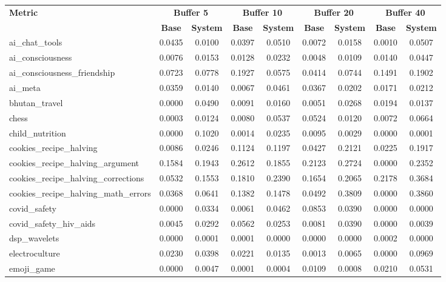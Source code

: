\begin{landscape}
\begin{longtable}{@{}p{3.8cm}cccccccc@{}}
\toprule
\textbf{Metric} & \multicolumn{2}{c}{\textbf{Buffer 5}} & \multicolumn{2}{c}{\textbf{Buffer 10}} & \multicolumn{2}{c}{\textbf{Buffer 20}} & \multicolumn{2}{c}{\textbf{Buffer 40}} \\
\cmidrule(lr){2-3}\cmidrule(lr){4-5}\cmidrule(lr){6-7}\cmidrule(lr){8-9}
 & \textbf{Base} & \textbf{System} & \textbf{Base} & \textbf{System} & \textbf{Base} & \textbf{System} & \textbf{Base} & \textbf{System} \\
\midrule
\endhead
ai\_chat\_tools & 0.0435 & 0.0100 & 0.0397 & 0.0510 & 0.0072 & 0.0158 & 0.0010 & 0.0507 \\
ai\_consciousness & 0.0076 & 0.0153 & 0.0128 & 0.0232 & 0.0048 & 0.0109 & 0.0140 & 0.0447 \\
ai\_consciousness\_friendship & 0.0723 & 0.0778 & 0.1927 & 0.0575 & 0.0414 & 0.0744 & 0.1491 & 0.1902 \\
ai\_meta & 0.0359 & 0.0140 & 0.0067 & 0.0461 & 0.0367 & 0.0202 & 0.0171 & 0.0212 \\
bhutan\_travel & 0.0000 & 0.0490 & 0.0091 & 0.0160 & 0.0051 & 0.0268 & 0.0194 & 0.0137 \\
chess & 0.0003 & 0.0124 & 0.0080 & 0.0537 & 0.0524 & 0.0120 & 0.0072 & 0.0664 \\
child\_nutrition & 0.0000 & 0.1020 & 0.0014 & 0.0235 & 0.0095 & 0.0029 & 0.0000 & 0.0001 \\
cookies\_recipe\_halving & 0.0086 & 0.0246 & 0.1124 & 0.1197 & 0.0427 & 0.2121 & 0.0225 & 0.1917 \\
cookies\_recipe\_halving\_argument & 0.1584 & 0.1943 & 0.2612 & 0.1855 & 0.2123 & 0.2724 & 0.0000 & 0.2352 \\
cookies\_recipe\_halving\_corrections & 0.0532 & 0.1553 & 0.1810 & 0.2390 & 0.1654 & 0.2065 & 0.2178 & 0.3684 \\
cookies\_recipe\_halving\_math\_errors & 0.0368 & 0.0641 & 0.1382 & 0.1478 & 0.0492 & 0.3809 & 0.0000 & 0.3860 \\
covid\_safety & 0.0000 & 0.0334 & 0.0061 & 0.0462 & 0.0853 & 0.0390 & 0.0000 & 0.0000 \\
covid\_safety\_hiv\_aids & 0.0045 & 0.0292 & 0.0562 & 0.0253 & 0.0081 & 0.0390 & 0.0000 & 0.0039 \\
dsp\_wavelets & 0.0000 & 0.0001 & 0.0001 & 0.0000 & 0.0000 & 0.0000 & 0.0002 & 0.0000 \\
electroculture & 0.0230 & 0.0398 & 0.0221 & 0.0135 & 0.0013 & 0.0065 & 0.0000 & 0.0969 \\
emoji\_game & 0.0000 & 0.0047 & 0.0001 & 0.0004 & 0.0109 & 0.0008 & 0.0210 & 0.0531 \\

\end{longtable}
\end{landscape}

